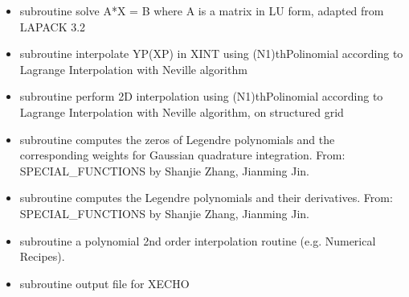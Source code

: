 \documentclass[letterpaper,10pt,english]{sphinxmanual}
\begin{document}
\begin{itemize}
\begin{itemize}
\item {} 
\sphinxAtStartPar
subroutine  solve A*X = B where A is a matrix in LU form, adapted from LAPACK 3.2

\item {} 
\sphinxAtStartPar
subroutine  \sphinxhyphen{} interpolate YP(XP) in XINT using (N\sphinxhyphen{}1)th\sphinxhyphen{}Polinomial according to Lagrange Interpolation with Neville algorithm

\item {} 
\sphinxAtStartPar
subroutine  \sphinxhyphen{} perform 2D interpolation using (N\sphinxhyphen{}1)th\sphinxhyphen{}Polinomial according to Lagrange Interpolation with Neville algorithm, on structured grid

\item {} 
\sphinxAtStartPar
subroutine  \sphinxhyphen{} computes the zeros of Legendre polynomials and the corresponding
weights for Gaussian quadrature integration. From: SPECIAL\_FUNCTIONS by Shanjie Zhang, Jianming Jin.

\item {} 
\sphinxAtStartPar
subroutine  \sphinxhyphen{} computes the Legendre polynomials and their derivatives. From: SPECIAL\_FUNCTIONS by Shanjie Zhang, Jianming Jin.

\item {} 
\sphinxAtStartPar
subroutine  \sphinxhyphen{} a polynomial 2nd order interpolation routine (e.g. Numerical Recipes).

\item {} 
\sphinxAtStartPar
subroutine  \sphinxhyphen{} output file for X\sphinxhyphen{}ECHO

\end{itemize}

\end{itemize}
\end{document}
